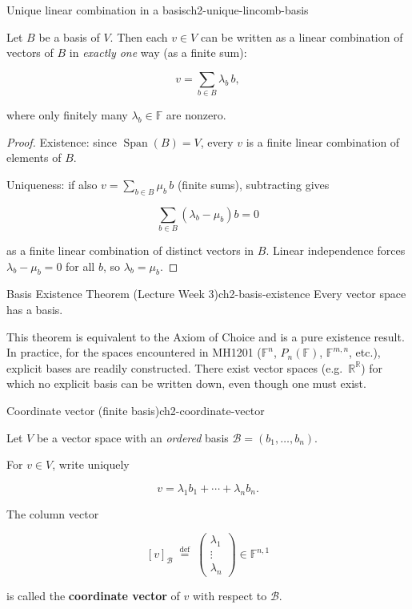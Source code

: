 \begin{theorem}{Unique linear combination in a basis}{ch2-unique-lincomb-basis}

Let $B$ be a basis of $V$. Then each $v\in V$ can be written as a linear combination of vectors of $B$ in \emph{exactly one} way (as a finite sum):

\[
v=\sum_{b\in B}\lambda_b\,b,
\]

where only finitely many $\lambda_b\in\mathbb{F}$ are nonzero.

\begin{proof}

Existence: since $\operatorname{Span}(B)=V$, every $v$ is a finite linear combination of elements of $B$.

Uniqueness: if also $v=\sum_{b\in B}\mu_b\,b$ (finite sums), subtracting gives

\[
\sum_{b\in B}(\lambda_b-\mu_b)b=0
\]

as a finite linear combination of distinct vectors in $B$. Linear independence forces $\lambda_b-\mu_b=0$ for all $b$, so $\lambda_b=\mu_b$.

\end{proof}

\end{theorem}

\begin{theorem}{Basis Existence Theorem (Lecture Week 3)}{ch2-basis-existence}
Every vector space has a basis.
\end{theorem}

This theorem is equivalent to the Axiom of Choice and is a pure existence result.
In practice, for the spaces encountered in MH1201 ($\mathbb{F}^n$, $P_n(\mathbb{F})$, $\mathbb{F}^{m,n}$, etc.), explicit bases are readily constructed.
There exist vector spaces (e.g.\ $\mathbb{R}^{\mathbb{R}}$) for which no explicit basis can be written down, even though one must exist.

\begin{definition}{Coordinate vector (finite basis)}{ch2-coordinate-vector}

Let $V$ be a vector space with an \emph{ordered} basis $\mathcal{B}=(b_1,\ldots,b_n)$.

For $v\in V$, write uniquely

\[
v=\lambda_1 b_1+\cdots+\lambda_n b_n.
\]

The column vector

\[
[v]_{\mathcal{B}}\;\stackrel{\mathrm{def}}{=}\;
\begin{pmatrix}\lambda_1\\ \vdots\\ \lambda_n\end{pmatrix}\in\mathbb{F}^{n,1}
\]

is called the \textbf{coordinate vector} of $v$ with respect to $\mathcal{B}$.

\end{definition}

